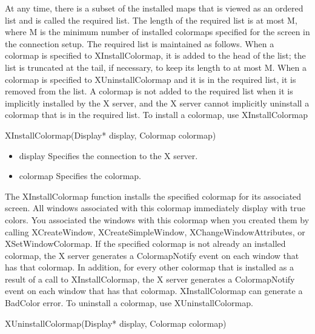 \documentclass{report}
\begin{document}
\begin{itemize}
            At any time, there is a subset of the installed maps that is viewed as an ordered list and is called the required list. The length of the required list is at most M, where M is the minimum number of installed colormaps specified for the screen in the connection setup. The required list is maintained as follows. When a colormap is specified to XInstallColormap, it is added to the head of the list; the list is truncated at the tail, if necessary, to keep its length to at most M. When a colormap is specified to XUninstallColormap and it is in the required list, it is removed from the list. A colormap is not added to the required list when it is implicitly installed by the X server, and the X server cannot implicitly uninstall a colormap that is in the required list.
            \bigbreak \noindent 
            To install a colormap, use XInstallColormap
            \bigbreak \noindent 
            \begin{cppcode}
                XInstallColormap(Display* display, Colormap colormap)
            \end{cppcode}
            \begin{itemize}
                \item display Specifies the connection to the X server.
                \item colormap Specifies the colormap.
            \end{itemize}
            The XInstallColormap function installs the specified colormap for its associated screen. All windows associated with this colormap immediately display with true colors. You associated the windows with this colormap when you created them by calling XCreateWindow, XCreateSimpleWindow, XChangeWindowAttributes, or XSetWindowColormap.
            \bigbreak \noindent 
            If the specified colormap is not already an installed colormap, the X server generates a ColormapNotify event on each window that has that colormap. In addition, for every other colormap that is installed as a result of a call to XInstallColormap, the X server generates a ColormapNotify event on each window that has that colormap.
            \bigbreak \noindent 
            XInstallColormap can generate a BadColor error.
            \bigbreak \noindent 
            To uninstall a colormap, use XUninstallColormap.
            \bigbreak \noindent 
            \begin{cppcode}
                XUninstallColormap(Display* display, Colormap colormap)
            \end{cppcode}

\end{itemize}
\end{document}
